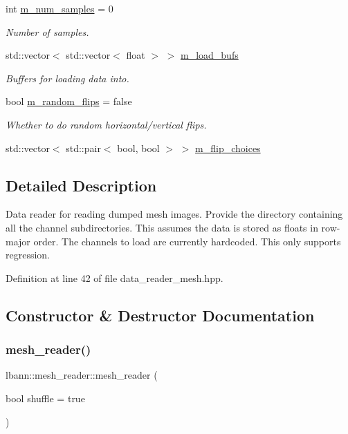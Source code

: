 \begin{DoxyCompactItemize}
int \hyperlink{classlbann_1_1mesh__reader_a93eb02b667d92b912958f8dd1ec8af05}{m\+\_\+num\+\_\+samples} = 0
\begin{DoxyCompactList}\small\item\em Number of samples. \end{DoxyCompactList}\item 
std\+::vector$<$ std\+::vector$<$ float $>$ $>$ \hyperlink{classlbann_1_1mesh__reader_a43bcee9494e51c397af690eb0291b168}{m\+\_\+load\+\_\+bufs}
\begin{DoxyCompactList}\small\item\em Buffers for loading data into. \end{DoxyCompactList}\item 
bool \hyperlink{classlbann_1_1mesh__reader_a0be20898f9c5d9b195587fb5fafc5d5a}{m\+\_\+random\+\_\+flips} = false
\begin{DoxyCompactList}\small\item\em Whether to do random horizontal/vertical flips. \end{DoxyCompactList}\item 
std\+::vector$<$ std\+::pair$<$ bool, bool $>$ $>$ \hyperlink{classlbann_1_1mesh__reader_aa9301a3dcaf08c03298f696e1430e67a}{m\+\_\+flip\+\_\+choices}
\end{DoxyCompactItemize}


\subsection{Detailed Description}
Data reader for reading dumped mesh images. Provide the directory containing all the channel subdirectories. This assumes the data is stored as floats in row-\/major order. The channels to load are currently hardcoded. This only supports regression. 

Definition at line 42 of file data\+\_\+reader\+\_\+mesh.\+hpp.



\subsection{Constructor \& Destructor Documentation}
\mbox{\label{classlbann_1_1mesh__reader_aa101fb0ec314baedda7b9453de1933b6}} 
\subsubsection{\texorpdfstring{mesh\+\_\+reader()}{mesh\_reader()}}
{\footnotesize\ttfamily lbann\+::mesh\+\_\+reader\+::mesh\+\_\+reader (\begin{DoxyParamCaption}\item[{bool}]{shuffle = {\ttfamily true} }\end{DoxyParamCaption})}



